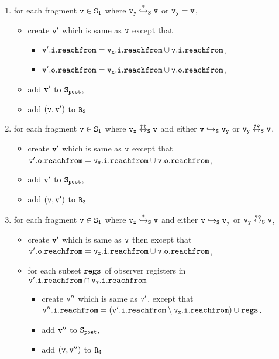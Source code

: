 \begin{itemize}
\begin{enumerate}
\item for each fragment $\tt v \in S_1$ where $\tt v_y \overset{*}\hookrightarrow_S v$ or $\tt v_y = v$, 
\begin{itemize}
	\item create  $\tt v'$ which is same as $\tt v$ except that
\begin{itemize}
 \item $\tt \mathtt{v}'.\mathtt{i}.\mathtt{reachfrom} = v_x.i.reachfrom \cup \tt \mathtt{v}.\mathtt{i}.\mathtt{reachfrom}$, 
\item $\tt \mathtt{v}'.\mathtt{o}.\mathtt{reachfrom} = v_x.i.reachfrom \cup \tt \mathtt{v}.\mathtt{o}.\mathtt{reachfrom}$, 
\end{itemize}
\item add $\tt v'$ to $\tt S_{post}$,
\item add $\tt (v,v')$ to $\tt R_2$
\end{itemize}
\item for each fragment $\tt v \in S_1$ where $\tt v_x \overset{**}\leftrightarrow_S v$ and either $\tt v \hookrightarrow_S v_y$ or $\tt v_y \overset{*o}\leftrightarrow_S v$, 
\begin{itemize}
\item  create $\tt v'$ which is same as $\tt v$ except that $\tt \mathtt{v}'.\mathtt{o}.\mathtt{reachfrom} = v_x.i.reachfrom \cup \tt \mathtt{v}.\mathtt{o}.\mathtt{reachfrom}$, 
 \item add $\tt v'$ to $\tt S_{post}$, 
 \item add $\tt (v,v')$ to $\tt R_3$

\end{itemize}


\item for each fragment $\tt v \in S_1$ where $\tt v_x \overset{*}\hookrightarrow_S v$ and either $\tt v \hookrightarrow_S v_y$ or $\tt v_y \overset{*o}\leftrightarrow_S v$,  
\begin{itemize}
\item create $\tt v'$ which is same as $\tt v$ then except that $\tt \mathtt{v}'.\mathtt{o}.\mathtt{reachfrom} = v_x.i.reachfrom \cup \tt \mathtt{v}.\mathtt{o}.\mathtt{reachfrom}$, 
\item for each subset $\tt regs$ of observer registers in $\mathtt{v}'.\mathtt{i}.\mathtt{reachfrom} \cap \tt v_x.i.reachfrom$
\begin{itemize}
\item create $\tt v''$ which is same as $\tt v'$, except that $\tt v''.i.reachfrom = (\mathtt{v}'.\mathtt{i}.\mathtt{reachfrom} \setminus v_x.i.reachfrom) \cup regs$.
\item add $\tt v''$ to $\tt S_{post}$,
\item add $\tt (v,v'')$ to $\tt R_4$
\end{itemize}
\end{itemize}


\end{enumerate}
\end{itemize}
